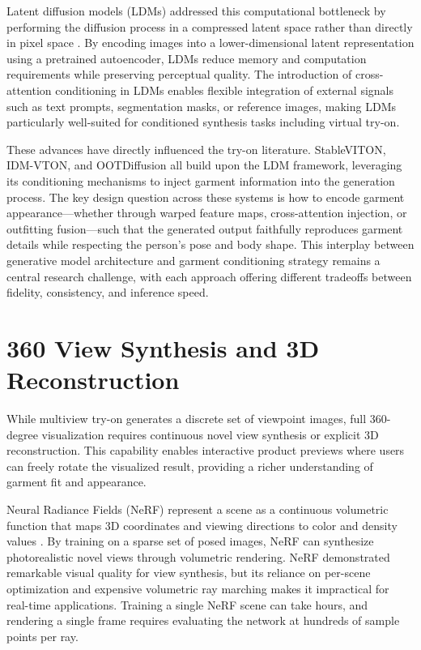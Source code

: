 Latent diffusion models (LDMs) addressed this computational bottleneck by performing the diffusion process in a compressed latent space rather than directly in pixel space \cite{rombach2022ldm}. By encoding images into a lower-dimensional latent representation using a pretrained autoencoder, LDMs reduce memory and computation requirements while preserving perceptual quality. The introduction of cross-attention conditioning in LDMs enables flexible integration of external signals such as text prompts, segmentation masks, or reference images, making LDMs particularly well-suited for conditioned synthesis tasks including virtual try-on.

These advances have directly influenced the try-on literature. StableVITON, IDM-VTON, and OOTDiffusion all build upon the LDM framework, leveraging its conditioning mechanisms to inject garment information into the generation process. The key design question across these systems is how to encode garment appearance—whether through warped feature maps, cross-attention injection, or outfitting fusion—such that the generated output faithfully reproduces garment details while respecting the person's pose and body shape. This interplay between generative model architecture and garment conditioning strategy remains a central research challenge, with each approach offering different tradeoffs between fidelity, consistency, and inference speed.

\section{360 View Synthesis and 3D Reconstruction}
While multiview try-on generates a discrete set of viewpoint images, full 360-degree visualization requires continuous novel view synthesis or explicit 3D reconstruction. This capability enables interactive product previews where users can freely rotate the visualized result, providing a richer understanding of garment fit and appearance.

Neural Radiance Fields (NeRF) represent a scene as a continuous volumetric function that maps 3D coordinates and viewing directions to color and density values \cite{mildenhall2020nerf}. By training on a sparse set of posed images, NeRF can synthesize photorealistic novel views through volumetric rendering. NeRF demonstrated remarkable visual quality for view synthesis, but its reliance on per-scene optimization and expensive volumetric ray marching makes it impractical for real-time applications. Training a single NeRF scene can take hours, and rendering a single frame requires evaluating the network at hundreds of sample points per ray.

